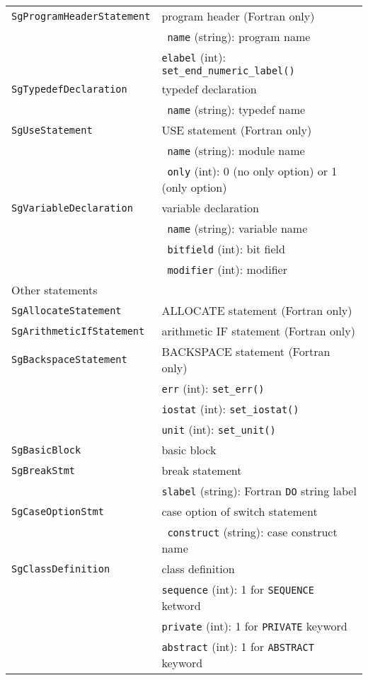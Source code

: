 \begin{longtable}[l]{l|p{10cm}}
 \texttt{SgProgramHeaderStatement}& program header (Fortran only)\\
 & ~\texttt{name} (string): program name\\
 & \texttt{elabel} (int): \texttt{set\_end\_numeric\_label()}\\
 \texttt{SgTypedefDeclaration}& typedef declaration\\
 & ~\texttt{name} (string): typedef name\\
 \texttt{SgUseStatement}& USE statement (Fortran only)\\
 & ~\texttt{name} (string): module name\\
 & ~\texttt{only} (int): 0 (no only option) or 1 (only option)\\
 \texttt{SgVariableDeclaration}& variable declaration \\
 & ~\texttt{name} (string): variable name\\
 & ~\texttt{bitfield} (int): bit field\\
 & ~\texttt{modifier} (int): modifier\\
 \hline
 \multicolumn{2}{l}{Other statements}\\
 \hline
 \texttt{SgAllocateStatement}& ALLOCATE statement (Fortran only)\\
 \texttt{SgArithmeticIfStatement}& arithmetic IF statement (Fortran only)\\
 \texttt{SgBackspaceStatement}& BACKSPACE statement (Fortran only)\\
 & \texttt{err} (int): \texttt{set\_err()}\\
 & \texttt{iostat} (int): \texttt{set\_iostat()}\\
 & \texttt{unit} (int): \texttt{set\_unit()}\\
 \texttt{SgBasicBlock}& basic block\\
 \texttt{SgBreakStmt}& break statement\\
 & \texttt{slabel} (string): Fortran \texttt{DO} string label\\
 \texttt{SgCaseOptionStmt}& case option of switch statement \\
 & ~\texttt{construct} (string): case construct name\\
 \texttt{SgClassDefinition}& class definition\\
 & \texttt{sequence} (int): 1 for \texttt{SEQUENCE} ketword\\
 & \texttt{private} (int):  1 for \texttt{PRIVATE} keyword\\
 & \texttt{abstract} (int): 1 for \texttt{ABSTRACT} keyword\\

\end{longtable}
